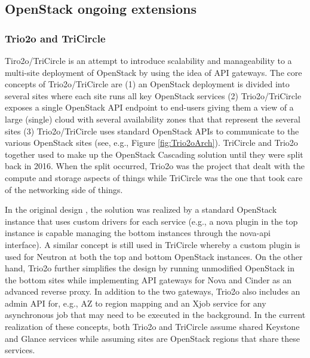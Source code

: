 
\subsection{OpenStack ongoing extensions}
\label{subsec:ga_extensions}
\subsubsection{Trio2o and TriCircle} 
Tiro2o/TriCircle is an attempt to introduce scalability and manageability to a multi-site deployment of OpenStack by using the idea of API gateways. The core concepts of Trio2o/TriCircle are (1) an OpenStack deployment is divided into several sites where each site runs all key OpenStack services (2) Trio2o/TriCircle exposes a single OpenStack API endpoint to end-users giving them a view of a large (single) cloud with several availability zones that that represent the several sites  (3) Trio2o/TriCircle uses standard OpenStack APIs to communicate to the various OpenStack sites (see, e.g., Figure \ref{fig:Trio2oArch}). TriCircle and Trio2o together used to make up the OpenStack Cascading solution \cite{OpenStackCascading} until they were split back in 2016. When the split occurred, Trio2o was the project that dealt with the compute and storage aspects of things while TriCircle was the one that took care of the networking side of things. 

In the original design \cite{OpenStackCascading}, the solution was realized by a standard OpenStack instance that uses custom drivers for each service (e.g., a nova plugin in the top instance is capable managing the bottom instances through the nova-api interface). A similar concept is still used in TriCircle whereby  a custom plugin is used for Neutron at both the top and bottom OpenStack instances. On the other hand, Trio2o further simplifies the design by running unmodified OpenStack in the bottom sites while implementing  API gateways for Nova and Cinder as an advanced reverse proxy. In addition to the two gateways, Trio2o also includes an admin API for, e.g., AZ to region mapping and an Xjob service for any asynchronous job that may need to be executed in the background. In the current realization of these concepts, both Trio2o and TriCircle assume shared Keystone and Glance services while assuming sites are OpenStack regions that share these services.  

